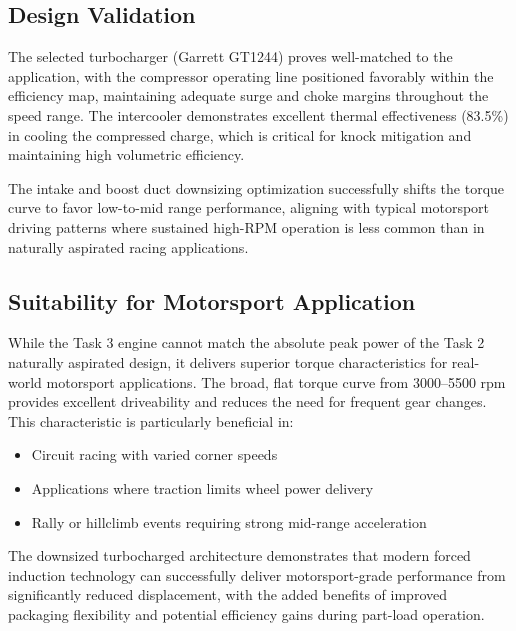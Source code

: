 \subsection{Design Validation}
The selected turbocharger (Garrett GT1244) proves well-matched to the application, with the compressor operating line positioned favorably within the efficiency map, maintaining adequate surge and choke margins throughout the speed range. The intercooler demonstrates excellent thermal effectiveness (83.5\%) in cooling the compressed charge, which is critical for knock mitigation and maintaining high volumetric efficiency.

The intake and boost duct downsizing optimization successfully shifts the torque curve to favor low-to-mid range performance, aligning with typical motorsport driving patterns where sustained high-RPM operation is less common than in naturally aspirated racing applications.

\subsection{Suitability for Motorsport Application}
While the Task 3 engine cannot match the absolute peak power of the Task 2 naturally aspirated design, it delivers superior torque characteristics for real-world motorsport applications. The broad, flat torque curve from 3000--5500 rpm provides excellent driveability and reduces the need for frequent gear changes. This characteristic is particularly beneficial in:
\begin{itemize}
    \item Circuit racing with varied corner speeds
    \item Applications where traction limits wheel power delivery
    \item Rally or hillclimb events requiring strong mid-range acceleration
\end{itemize}

The downsized turbocharged architecture demonstrates that modern forced induction technology can successfully deliver motorsport-grade performance from significantly reduced displacement, with the added benefits of improved packaging flexibility and potential efficiency gains during part-load operation.